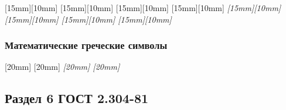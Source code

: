 {
  {
    \DrawChars{\textAlpha \textBeta \textGamma \textDelta \textEpsilon \textZeta \textEta \textTheta \textIota \textKappa \textLambda \textMu \textNu}[15mm][10mm]
    \DrawChars{\textXi \textOmicron \textPi \textRho \textSigma \textTau \textUpsilon \textPhi \textChi \textPsi \textOmega}[15mm][10mm]
    \DrawChars{\textalpha \textbeta \textgamma \textdelta \textepsilon \textzeta \texteta \texttheta \textiota \textkappa \textlambda \textmu}[15mm][10mm]
    \DrawChars{\textnu \textxi \textomicron \textpi \textrho \textsigma \texttau \textupsilon \textphi \textchi \textpsi \textomega}[15mm][10mm]
  }
  {
    \slshape
    \DrawChars{\textAlpha \textBeta \textGamma \textDelta \textEpsilon \textZeta \textEta \textTheta \textIota \textKappa \textLambda \textMu \textNu}[15mm][10mm]
    \DrawChars{\textXi \textOmicron \textPi \textRho \textSigma \textTau \textUpsilon \textPhi \textChi \textPsi \textOmega}[15mm][10mm]
    \DrawChars{\textalpha \textbeta \textgamma \textdelta \textepsilon \textzeta \texteta \texttheta \textiota \textkappa \textlambda \textmu \textnu}[15mm][10mm]
    \DrawChars{\textxi \textomicron \textpi \textrho \textsigma \texttau \textupsilon \textphi \textchi \textpsi \textomega}[15mm][10mm]
  }
}

\newpage
\subsubsection{Математические греческие символы}

{
  {
    \DrawChars{\Alpha \Beta \Gamma \Delta \Epsilon \Zeta \Eta \Theta \Iota \Kappa \Lambda \Mu \Nu \Xi}
    \DrawChars{\Omicron \Pi \Rho \Sigma \Tau \Upsilon \Phi \Chi \Psi \Omega}
    \DrawChars{\alpha \beta \gamma \delta \epsilon \zeta \eta \theta \iota \kappa \lambda \mu \nu}[20mm]
    \DrawChars{\xi \omicron \pi \rho \sigma \tau \upsilon \phi \chi \psi \omega}[20mm]
  }
  {
    \slshape
    \DrawChars{\Alpha \Beta \Gamma \Delta \Epsilon \Zeta \Eta \Theta \Iota \Kappa \Lambda \Mu \Nu \Xi \Omicron}
    \DrawChars{\Pi \Rho \Sigma \Tau \Upsilon \Phi \Chi \Psi \Omega}
    \DrawChars{\alpha \beta \gamma \delta \epsilon \zeta \eta \theta \iota \kappa \lambda \mu \nu \xi \omicron}[20mm]
    \DrawChars{\pi \rho \sigma \tau \upsilon \phi \chi \psi \omega}[20mm]
  }
}

\newpage
\subsection{Раздел 6 ГОСТ 2.304-81}
\makeatletter

